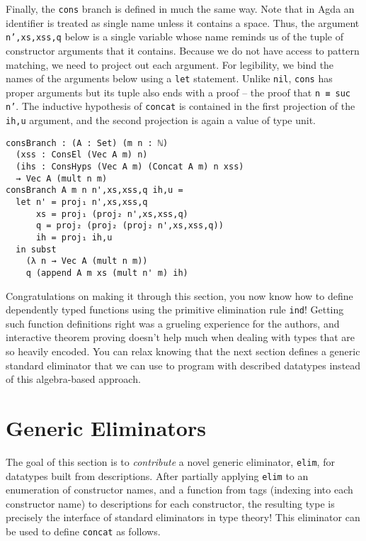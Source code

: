 \documentclass[preprint,nonatbib]{sigplanconf}
\begin{document}
Finally, the {\tt cons} branch is defined in much the same way. Note
that in {\sc Agda} an identifier is treated as single name unless it
contains a space. Thus, the argument {\tt n',xs,xss,q} below is a
single variable whose name reminds us of the tuple of constructor
arguments that it contains. Because we do not have access to pattern
matching, we need to project out each argument. For legibility, we
bind the names of the arguments below using a {\tt let} statement.
Unlike {\tt nil}, {\tt cons} has proper arguments but its tuple also
ends with a proof -- the proof that {\tt n ≡ suc n'}. The inductive
hypothesis of {\tt concat} is contained in the first projection of the
{\tt ih,u} argument, and the second projection is again a value of
type unit.

\begin{verbatim}
consBranch : (A : Set) (m n : ℕ)
  (xss : ConsEl (Vec A m) n)
  (ihs : ConsHyps (Vec A m) (Concat A m) n xss)
  → Vec A (mult n m)
consBranch A m n n',xs,xss,q ih,u =
  let n' = proj₁ n',xs,xss,q
      xs = proj₁ (proj₂ n',xs,xss,q)
      q = proj₂ (proj₂ (proj₂ n',xs,xss,q))
      ih = proj₁ ih,u
  in subst
    (λ n → Vec A (mult n m))
    q (append A m xs (mult n' m) ih)
\end{verbatim}

Congratulations on making it through this section, you now know how to define dependently typed
functions using the primitive elimination rule {\tt ind}!
Getting such function definitions right was a grueling experience for
the authors, and interactive theorem proving doesn't help much when
dealing with types that are so heavily encoded. You can relax knowing
that the next section defines a generic standard eliminator that we
can use to program with described datatypes instead of this
algebra-based approach.

\section{Generic Eliminators}
\label{sec:elim}

The goal of this section is to {\it contribute} a novel generic
eliminator, {\tt elim}, for datatypes built from descriptions.
After partially applying {\tt elim} to an enumeration of constructor
names, and a function from tags (indexing into each constructor name)
to descriptions for each constructor, the resulting type is precisely
the interface of standard eliminators in type theory!  This eliminator can
be used to define {\tt concat} as follows.
\end{document}
